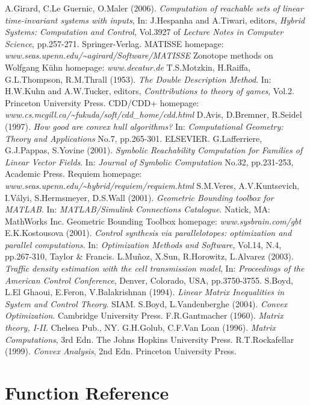 \documentclass{report}
\begin{document}
\begin{thebibliography}{XX}
 A.Girard, C.Le Guernic, O.Maler (2006).
{\it Computation of reachable sets of linear
time-invariant systems with inputs}, In: J.Hespanha and A.Tiwari, editors,
{\it Hybrid Systems: Computation and Control}, Vol.3927 of
{\it Lecture Notes in Computer Science}, pp.257-271. Springer-Verlag.
 MATISSE homepage:
{\it www.seas.upenn.edu/\~{ }agirard/Software/MATISSE}
 Zonotope methods on Wolfgang K\"{u}hn homepage:
{\it www.decatur.de}
 T.S.Motzkin, H.Raiffa, G.L.Thompson, R.M.Thrall (1953).
{\it The Double Description Method}. In: H.W.Kuhn and A.W.Tucker, editors,
{\it Conttributions to theory of games}, Vol.2. Princeton University Press.
 CDD/CDD+ homepage:
{\it www.cs.mcgill.ca/\~{ }fukuda/soft/cdd\_home/cdd.html}
 D.Avis, D.Bremner, R.Seidel (1997). {\it How good are convex
hull algorithms?} In: {\it Computational Geometry: Theory and Applications}
No.7, pp.265-301. ELSEVIER.
 G.Lafferriere, G.J.Pappas, S.Yovine (2001). {\it Symbolic
Reachability Computation for Families of Linear Vector Fields}. In:
{\it Journal of Symbolic Computation} No.32, pp.231-253, Academic Press.
 Requiem homepage:
{\it www.seas.upenn.edu/\~{ }hybrid/requiem/requiem.html}
 S.M.Veres, A.V.Kuntsevich, I.V\'{a}lyi, S.Hermsmeyer,
D.S.Wall (2001). {\it Geometric Bounding toolbox for MATLAB}. In:
{\it MATLAB/Simulink Connections Catalogue}. Natick, MA: MathWorks Inc.
 Geometric Bounding Toolbox homepage:
{\it www.sysbrain.com/gbt}
 E.K.Kostousova (2001). {\it Control synthesis via
parallelotopes: optimization and parallel computations}.
In: {\it Optimization Methods and Software}, Vol.14, N.4, pp.267-310,
Taylor \& Francis.
 L.Mu\~{n}oz, X.Sun, R.Horowitz, L.Alvarez (2003).
{\it Traffic density estimation with the cell transmission model},
In: {\it Proceedings of the American Control Conference},
Denver, Colorado, USA, pp.3750-3755.
 S.Boyd, L.El Ghaoui, E.Feron, V.Balakrishnan (1994).
{\it Linear Matrix Inequalities in System and Control Theory}. SIAM.
 S.Boyd, L.Vandenberghe (2004).
{\it Convex Optimization}. Cambridge University Press.
 F.R.Gantmacher (1960). {\it Matrix theory, I-II}.
Chelsea Pub., NY.
 G.H.Golub, C.F.Van Loan (1996). {\it Matrix Computations},
3rd Edn. The Johns Hopkins University Press.
 R.T.Rockafellar (1999). {\it Convex Analysis}, 2nd Edn.
Princeton University Press.
\end{thebibliography}
\appendix
\chapter{Function Reference}\label{appendix_a}

\end{document}
